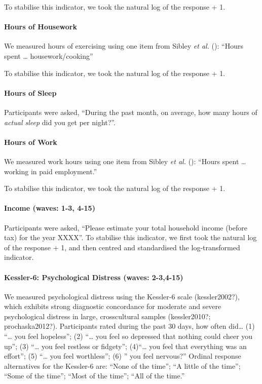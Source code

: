 \documentclass[
  single column]{article}
\let\oldparagraph\paragraph
\renewcommand{\paragraph}[1]{\oldparagraph{#1}\mbox{}}
\begin{document}
To stabilise this indicator, we took the natural log of the response +
1.

\paragraph{Hours of Housework}\label{hours-of-housework-1}

We measured hours of exercising using one item from Sibley \emph{et al.}
(): ``Hours spent \ldots{}
housework/cooking''

To stabilise this indicator, we took the natural log of the response +
1.

\paragraph{Hours of Sleep}\label{hours-of-sleep}

Participants were asked, ``During the past month, on average, how many
hours of \emph{actual sleep} did you get per night?''.

\paragraph{Hours of Work}\label{hours-of-work}

We measured work hours using one item from Sibley \emph{et al.}
(): ``Hours spent \ldots{} working in
paid employment.''

To stabilise this indicator, we took the natural log of the response +
1.

\paragraph{Income (waves: 1-3, 4-15)}\label{income-waves-1-3-4-15}

Participants were asked, ``Please estimate your total household income
(before tax) for the year XXXX''. To stabilise this indicator, we first
took the natural log of the response + 1, and then centred and
standardised the log-transformed indicator.

\paragraph{Kessler-6: Psychological Distress (waves:
2-3,4-15)}\label{kessler-6-psychological-distress-waves-2-34-15}

We measured psychological distress using the Kessler-6 scale
(kessler2002?), which exhibits strong diagnostic concordance for
moderate and severe psychological distress in large, crosscultural
samples (kessler2010?; prochaska2012?). Participants rated during the
past 30 days, how often did\ldots{} (1) ``\ldots{} you feel hopeless'';
(2) ``\ldots{} you feel so depressed that nothing could cheer you up'';
(3) ``\ldots{} you feel restless or fidgety''; (4)``\ldots{} you feel
that everything was an effort''; (5) ``\ldots{} you feel worthless'';
(6) '' you feel nervous?'' Ordinal response alternatives for the
Kessler-6 are: ``None of the time''; ``A little of the time''; ``Some of
the time''; ``Most of the time''; ``All of the time.''
\end{document}
